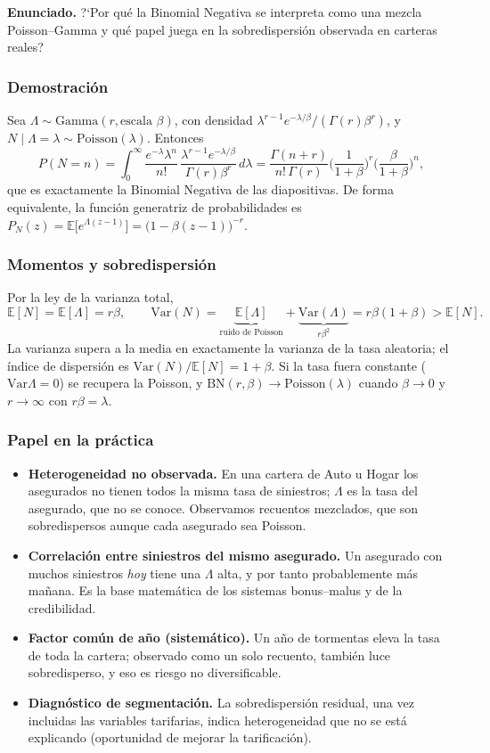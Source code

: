 \documentclass[a4paper,12pt]{article}
\newcommand{\E}{\mathbb{E}}
\newcommand{\Var}{\mathrm{Var}}
\begin{document}
\noindent\textbf{Enunciado.} ?`Por qu\'e la Binomial Negativa se interpreta como una mezcla Poisson--Gamma y qu\'e papel juega en la sobredispersi\'on observada en carteras reales?

\subsubsection*{Demostraci\'on}
Sea $\Lambda\sim\text{Gamma}(r,\text{escala }\beta)$, con densidad $\lambda^{r-1}e^{-\lambda/\beta}/(\Gamma(r)\beta^r)$, y $N\mid\Lambda=\lambda\sim\text{Poisson}(\lambda)$. Entonces
\[
P(N=n)=\int_0^\infty\frac{e^{-\lambda}\lambda^n}{n!}\,\frac{\lambda^{r-1}e^{-\lambda/\beta}}{\Gamma(r)\beta^r}\,d\lambda=\frac{\Gamma(n+r)}{n!\,\Gamma(r)}\Big(\frac1{1+\beta}\Big)^{r}\Big(\frac{\beta}{1+\beta}\Big)^{n},
\]
que es exactamente la Binomial Negativa de las diapositivas. De forma equivalente, la funci\'on generatriz de probabilidades es $P_N(z)=\E\big[e^{\Lambda(z-1)}\big]=\big(1-\beta(z-1)\big)^{-r}$.

\subsubsection*{Momentos y sobredispersi\'on}
Por la ley de la varianza total,
\[
\E[N]=\E[\Lambda]=r\beta,\qquad \Var(N)=\underbrace{\E[\Lambda]}_{\text{ruido de Poisson}}+\underbrace{\Var(\Lambda)}_{r\beta^2}=r\beta(1+\beta)>\E[N].
\]
La varianza supera a la media en exactamente la varianza de la tasa aleatoria; el \'indice de dispersi\'on es $\Var(N)/\E[N]=1+\beta$. Si la tasa fuera constante ($\Var\Lambda=0$) se recupera la Poisson, y $\text{BN}(r,\beta)\to\text{Poisson}(\lambda)$ cuando $\beta\to0$ y $r\to\infty$ con $r\beta=\lambda$.

\subsubsection*{Papel en la pr\'actica}
\begin{itemize}[leftmargin=*]
\item \textbf{Heterogeneidad no observada.} En una cartera de Auto u Hogar los asegurados no tienen todos la misma tasa de siniestros; $\Lambda$ es la tasa del asegurado, que no se conoce. Observamos recuentos mezclados, que son sobredispersos aunque cada asegurado sea Poisson.
\item \textbf{Correlaci\'on entre siniestros del mismo asegurado.} Un asegurado con muchos siniestros \emph{hoy} tiene una $\Lambda$ alta, y por tanto probablemente m\'as ma\~nana. Es la base matem\'atica de los sistemas bonus--malus y de la credibilidad.
\item \textbf{Factor com\'un de a\~no (sistem\'atico).} Un a\~no de tormentas eleva la tasa de toda la cartera; observado como un solo recuento, tambi\'en luce sobredisperso, y eso es riesgo no diversificable.
\item \textbf{Diagn\'ostico de segmentaci\'on.} La sobredispersi\'on residual, una vez incluidas las variables tarifarias, indica heterogeneidad que no se est\'a explicando (oportunidad de mejorar la tarificaci\'on).
\end{itemize}
\end{document}
